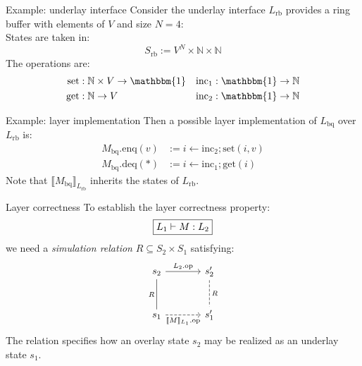 \documentclass[aspectratio=54]{beamer}
\newcommand{\kw}[1]{\ensuremath{ \mathrm{#1} }}
\begin{document}
\begin{frame}{Example: underlay interface} %
  Consider the underlay interface
  $L_\kw{rb}$ provides a ring buffer with elements of $V$ and size $N = 4$:
  \[
  \]
  States are taken in:
  \[
    S_\kw{rb} := V^N \times \mathbb{N} \times \mathbb{N}
  \]
  The operations are:
  \begin{align*}
    \kw{set} &: \mathbb{N} \times V \rightarrow \mathbbm{1} &
    \kw{inc}_1 &: \mathbbm{1} \rightarrow \mathbb{N} \\
    \kw{get} &: \mathbb{N} \rightarrow V &
    \kw{inc}_2 &: \mathbbm{1} \rightarrow \mathbb{N}
  \end{align*}
\end{frame}

\begin{frame}{Example: layer implementation} %
  Then a possible layer implementation of $L_\kw{bq}$
  over $L_\kw{rb}$
  is:
  \begin{align*}
    M_\kw{bq}.\kw{enq}(v) &:=
      i \leftarrow \kw{inc}_2 \mathop{;} \kw{set}(i, v) \\
    M_\kw{bq}.\kw{deq}(*) &:=
      i \leftarrow \kw{inc}_1 \mathop{;} \kw{get}(i)
  \end{align*}
  Note that $\llbracket M_\kw{bq} \rrbracket_{L_\kw{rb}}$
  inherits the states of $L_\kw{rb}$.
  \begin{center}
  \end{center}
\end{frame}

\begin{frame}[fragile]{Layer correctness} %
  To establish the layer correctness property:
  \[
    \fbox{$L_1 \vdash M : L_2$}
  \]
  we need a \emph{simulation relation}
  $R \subseteq S_2 \times S_1$ satisfying:
  \[
    \begin{tikzcd}[sep=large]
      s_2 \ar[r, "L_2.\kw{op}"] \ar[d, "R"', dash] &
      s_2' \ar[d, "R", dash, dashed] \\
      s_1 \ar[r, "\llbracket M \rrbracket_{L_1}.\kw{op}"', dashed] &
      s_1'
    \end{tikzcd}
  \]
  The relation specifies how an overlay state $s_2$
  may be realized as an underlay state $s_1$.
\end{frame}
\end{document}
